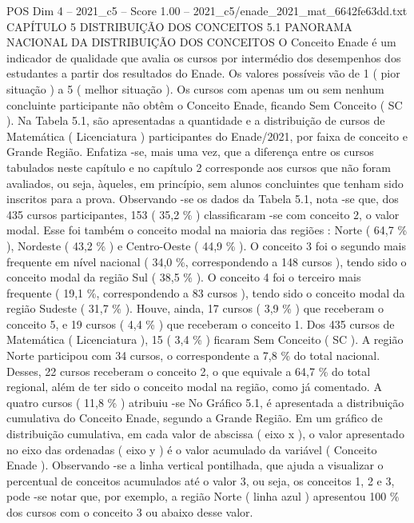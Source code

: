 \begin{textsample}{POS Dim 4 – 2021\_c5 – Score 1.00 – 2021\_c5/enade\_2021\_mat\_6642fe63dd.txt}  \label{ex:f4_pos_215}
CAPÍTULO 5 DISTRIBUIÇÃO DOS CONCEITOS 5.1 PANORAMA NACIONAL DA DISTRIBUIÇÃO DOS CONCEITOS O Conceito Enade é um indicador de qualidade que avalia os cursos por intermédio dos desempenhos dos estudantes a partir dos resultados do Enade.
Os valores possíveis vão de 1 ( pior situação ) a 5 ( melhor situação ).
Os cursos com apenas um ou sem nenhum concluinte participante não obtêm o Conceito Enade, ficando Sem Conceito ( SC ).
Na Tabela 5.1, são apresentadas a quantidade e a distribuição de cursos de Matemática ( Licenciatura ) participantes do Enade/2021, por faixa de conceito e Grande Região.
Enfatiza -se, mais uma vez, que a diferença entre os cursos tabulados neste capítulo e no capítulo 2 corresponde aos cursos que não foram avaliados, ou seja, àqueles, em princípio, sem alunos concluintes que tenham sido inscritos para a prova.
Observando -se os dados da Tabela 5.1, nota -se que, dos 435 cursos participantes, 153 ( 35,2 \% ) classificaram -se com conceito 2, o valor modal.
Esse foi também o conceito modal na maioria das regiões : Norte ( 64,7 \% ), Nordeste ( 43,2 \% ) e Centro-Oeste ( 44,9 \% ).
O conceito 3 foi o segundo mais frequente em nível nacional ( 34,0 \%, correspondendo a 148 cursos ), tendo sido o conceito modal da região Sul ( 38,5 \% ).
O conceito 4 foi o terceiro mais frequente ( 19,1 \%, correspondendo a 83 cursos ), tendo sido o conceito modal da região Sudeste ( 31,7 \% ).
Houve, ainda, 17 cursos ( 3,9 \% ) que receberam o conceito 5, e 19 cursos ( 4,4 \% ) que receberam o conceito 1.
Dos 435 cursos de Matemática ( Licenciatura ), 15 ( 3,4 \% ) ficaram Sem Conceito ( SC ).
A região Norte participou com 34 cursos, o correspondente a 7,8 \% do total nacional.
Desses, 22 cursos receberam o conceito 2, o que equivale a 64,7 \% do total regional, além de ter sido o conceito modal na região, como já comentado.
A quatro cursos ( 11,8 \% ) atribuiu -se No Gráfico 5.1, é apresentada a distribuição cumulativa do Conceito Enade, segundo a Grande Região.
Em um gráfico de distribuição cumulativa, em cada valor de abscissa ( eixo x ), o valor apresentado no eixo das ordenadas ( eixo y ) é o valor acumulado da variável ( Conceito Enade ).
Observando -se a linha vertical pontilhada, que ajuda a visualizar o percentual de conceitos acumulados até o valor 3, ou seja, os conceitos 1, 2 e 3, pode -se notar que, por exemplo, a região Norte ( linha azul ) apresentou 100 \% dos cursos com o conceito 3 ou abaixo desse valor.

\end{textsample}

